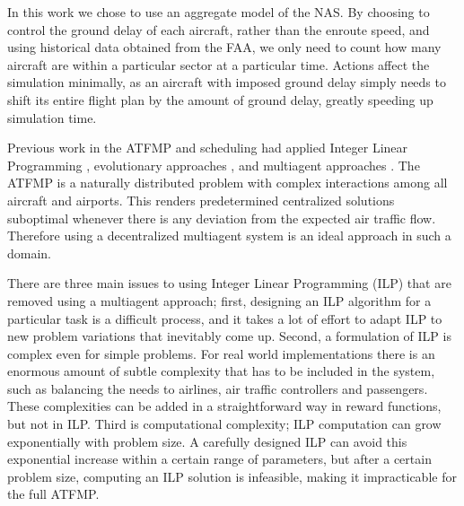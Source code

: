 \documentclass{aamas2014}
\begin{document}
In this work we chose to use an aggregate model of the NAS. By choosing to control the ground delay of each aircraft, rather than the enroute speed, and using historical data obtained from the FAA, we only need to count how many aircraft are within a particular sector at a particular time. Actions affect the simulation minimally, as an aircraft with imposed ground delay simply needs to shift its entire flight plan by the amount of ground delay, greatly speeding up simulation time.

Previous work in the ATFMP and scheduling had applied Integer Linear Programming \cite{Bertsimas}, evolutionary approaches \cite{Agogino:2009:EEM:1570256.1570258, Rios}, and multiagent approaches \cite{tumer-agogino_jaamas12,Curran:2013:AHC:2484920.2485183, 664154, Sislak:2008:AMA:1402744.1402755}. The ATFMP is a naturally distributed problem with complex interactions among all aircraft and airports. This renders predetermined centralized solutions suboptimal whenever there is any deviation from the expected air traffic flow. Therefore using a decentralized multiagent system is an ideal approach in such a domain.

There are three main issues to using Integer Linear Programming (ILP) that are removed using a multiagent approach; first, designing an ILP algorithm for a particular task is a difficult process, and it takes a lot of effort to adapt ILP to new problem variations that inevitably come up. Second, a formulation of ILP is complex even for simple problems. For real world implementations there is an enormous amount of subtle complexity that has to be included in the system, such as balancing the needs to airlines, air traffic controllers and passengers. These complexities can be added in a straightforward way in reward functions, but not in ILP. Third is computational complexity; ILP computation can grow exponentially with problem size. A carefully designed ILP can avoid this exponential increase within a certain range of parameters, but after a certain problem size, computing an ILP solution is infeasible, making it impracticable for the full ATFMP.
\end{document}

